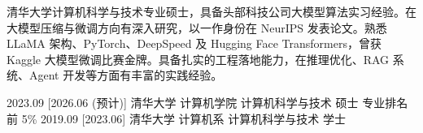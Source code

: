 \documentclass[zh]{resume}
\begin{document}
\makeheader

清华大学计算机科学与技术专业硕士，具备头部科技公司大模型算法实习经验。在大模型压缩与微调方向有深入研究，以一作身份在 NeurIPS 发表论文。熟悉 LLaMA 架构、PyTorch、DeepSpeed 及 Hugging Face Transformers，曾获 Kaggle 大模型微调比赛金牌。具备扎实的工程落地能力，在推理优化、RAG 系统、Agent 开发等方面有丰富的实践经验。



\begin{educations}
  \education%
    {2023.09}%
    [2026.06 (预计)]%
    {清华大学}%
    {计算机学院}%
    {计算机科学与技术}%
    {硕士 \quad 专业排名前 5\%}
  \separator{0.5ex}
  \education%
    {2019.09}%
    [2023.06]%
    {清华大学}%
    {计算机系}%
    {计算机科学与技术}%
    {学士}
\end{educations}
\end{document}
